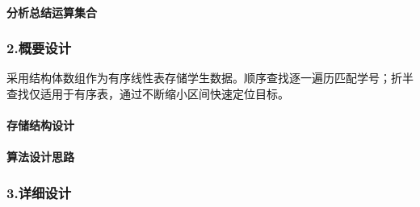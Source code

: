 \documentclass{ctexart}
\begin{document}
\paragraph{分析总结运算集合}
\subsubsection{2.概要设计}
采用结构体数组作为有序线性表存储学生数据。顺序查找逐一遍历匹配学号；折半查找仅适用于有序表，通过不断缩小区间快速定位目标。
\paragraph{存储结构设计}
\paragraph{算法设计思路}
\subsubsection{3.详细设计}
\end{document}
